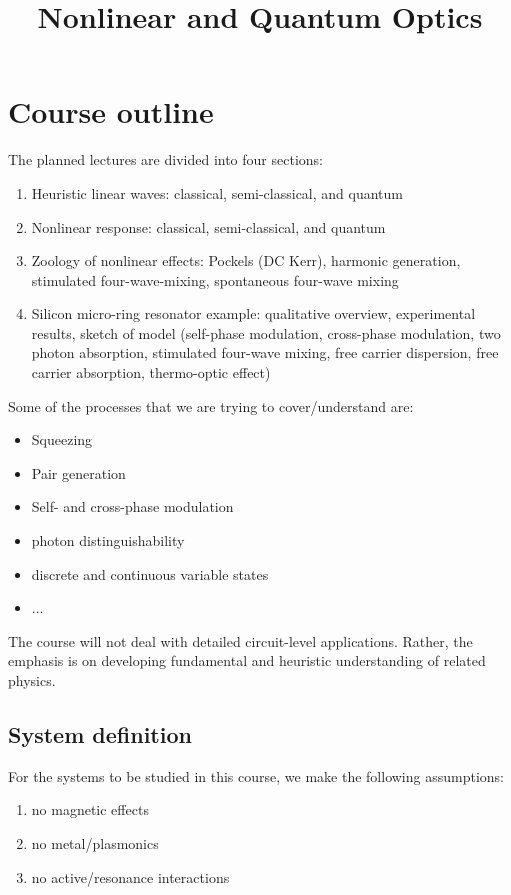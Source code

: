 \documentclass{article}
\begin{document}
\title{Nonlinear and Quantum Optics}
\maketitle
\thispagestyle{empty}
\tableofcontents

\section{Course outline}

The planned lectures are divided into four sections:
\begin{enumerate}
    \item Heuristic linear waves: classical, semi-classical, and quantum
    \item Nonlinear response: classical, semi-classical, and quantum
    \item Zoology of nonlinear effects: Pockels (DC Kerr), harmonic generation, stimulated four-wave-mixing, spontaneous four-wave mixing
    \item Silicon micro-ring resonator example: qualitative overview, experimental results, sketch of model (self-phase modulation, cross-phase modulation, two photon absorption, stimulated four-wave mixing, free carrier dispersion, free carrier absorption, thermo-optic effect)
\end{enumerate}

Some of the processes that we are trying to cover/understand are:

\begin{itemize}
    \item Squeezing
    \item Pair generation
    \item Self- and cross-phase modulation
    \item photon distinguishability
    \item discrete and continuous variable states
    \item ...
\end{itemize}

The course will not deal with detailed circuit-level applications. Rather, the emphasis is on developing fundamental and heuristic understanding of related physics.

\subsection{System definition}
For the systems to be studied in this course, we make the following assumptions:
\begin{enumerate}
    \item no magnetic effects
    \item no metal/plasmonics
    \item no active/resonance interactions
\end{enumerate}
\end{document}

